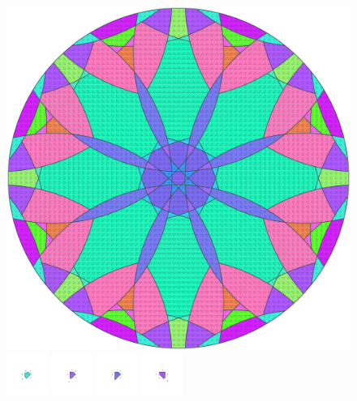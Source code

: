 \documentclass[text.tex]{subfiles}
\begin{document}
\clearpage
\pagestyle{fancy}
\fancyhf{}
\begin{figure}[h!]
\centering
\includegraphics[width=1\textwidth]{img/results/circle8/circle8_232233_(65_-25alpha_2).pdf}
\includegraphics[width=0.12\textwidth]{img/results/circle8/circle8_232233_(65_-25alpha_2)_001.pdf}
\includegraphics[width=0.12\textwidth]{img/results/circle8/circle8_232233_(65_-25alpha_2)_002.pdf}
\includegraphics[width=0.12\textwidth]{img/results/circle8/circle8_232233_(65_-25alpha_2)_003.pdf}
\includegraphics[width=0.12\textwidth]{img/results/circle8/circle8_232233_(65_-25alpha_2)_004.pdf}

\end{figure}
\end{document}
